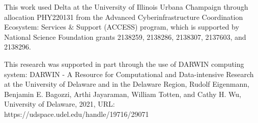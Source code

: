 This work used Delta at the University of Illinois Urbana Champaign through allocation PHY220131 from the Advanced 
Cyberinfrastructure Coordination Ecosystem: Services $\&$ Support (ACCESS) program, which is supported by National 
Science Foundation grants 2138259, 2138286, 2138307, 2137603, and 2138296. 

This research was supported in part through the use of DARWIN computing system: DARWIN - A Resource for Computational 
and Data-intensive Research at the University of Delaware and in the Delaware Region, Rudolf Eigenmann, Benjamin E. 
Bagozzi, Arthi Jayaraman, William Totten, and Cathy H. Wu, University of Delaware, 2021, URL: https://udspace.udel.edu/handle/19716/29071
